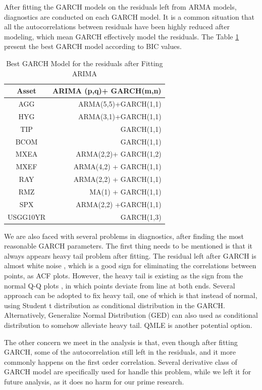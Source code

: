 \documentclass[12pt]{article}
\begin{document}
After fitting the GARCH models on the residuals left from ARMA models, diagnostics are conducted on each GARCH model. It is a common situation that all the autocorrelations between residuals have been highly reduced after modeling, which mean GARCH effectively model the residuals. The Table \ref{table:BestGarch} present the best GARCH model according to BIC values. 

\begin{table}[!h]
\caption{Best GARCH Model for the residuals after Fitting ARIMA}
\centering 
\begin{tabular}{ | c || r | } 
 \hline
Asset & ARIMA (p,q)+ GARCH(m,n) \\
  \hline \hline
AGG & ARMA(5,5)+GARCH(1,1) \\ 
HYG & ARMA(3,1)+GARCH(1,1) \\ 
TIP &  GARCH(1,1)\\ 
BCOM & GARCH(1,1)\\ 
MXEA & ARMA(2,2)+ GARCH(1,2) \\ 
MXEF & ARMA(4,2) + GARCH(1,1)\\ 
RAY &  ARMA(2,2) + GARCH(1,1)\\ 
RMZ & MA(1) + GARCH(1,1) \\ 
SPX & ARMA(2,2) +GARCH(1,1)\\ 
USGG10YR & GARCH(1,3) \\
 \hline
\end{tabular}
\label{table:BestGarch}
\end{table}


 We are also faced with several problems in diagnostics, after finding the most reasonable GARCH parameters. The first thing needs to be mentioned is that it always appears heavy tail problem after fitting.  The residual left after GARCH is almost white noise  , which is a good sign for eliminating the correlations between points, as ACF plots. However, the heavy tail is existing as the sign from the normal Q-Q plots   , in which points deviate from line at both ends. Several approach can be adopted to fix heavy tail, one of which is that instead of normal, using Student t distribution as conditional distribution in the GARCH. Alternatively, Generalize Normal Distribution (GED) can also used as conditional distribution to somehow alleviate heavy tail. QMLE is another potential option. 
 
 The other concern we meet in the analysis is that, even though after fitting GARCH, some of the autocorrelation still left in the residuals, and it more commonly happens on the first order correlation. Several derivative class of GARCH model are specifically used for handle this problem, while we left it for future analysis, as it does no harm for our prime research.
\end{document}
